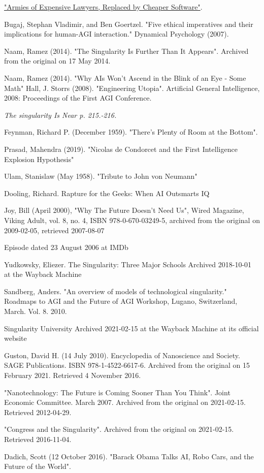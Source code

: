\documentclass[a4paper]{article}
\begin{document}
\begin{thebibliography}{9}
\href{https://www.nytimes.com/2011/03/05/science/05legal.html}{"Armies of Expensive Lawyers, Replaced by Cheaper Software"}.

  Bugaj, Stephan Vladimir, and Ben Goertzel. "Five ethical imperatives and their implications for human-AGI interaction." Dynamical Psychology (2007).

Naam, Ramez (2014). "The Singularity Is Further Than It Appears". Archived from the original on 17 May 2014. 

 Naam, Ramez (2014). "Why AIs Won't Ascend in the Blink of an Eye - Some Math"
 Hall, J. Storrs (2008). "Engineering Utopia". Artificial General Intelligence, 2008: Proceedings of the First AGI Conference.

 \textit{The singularity Is Near p. 215.-216.}

 Feynman, Richard P. (December 1959). "There's Plenty of Room at the Bottom".

Prasad, Mahendra (2019). "Nicolas de Condorcet and the First Intelligence Explosion Hypothesis"

 Ulam, Stanislaw (May 1958). "Tribute to John von Neumann"

 Dooling, Richard. Rapture for the Geeks: When AI Outsmarts IQ

Joy, Bill (April 2000), "Why The Future Doesn't Need Us", Wired Magazine, Viking Adult, vol. 8, no. 4, ISBN 978-0-670-03249-5, archived from the original on 2009-02-05, retrieved 2007-08-07

 Episode dated 23 August 2006 at IMDb

Yudkowsky, Eliezer. The Singularity: Three Major Schools Archived 2018-10-01 at the Wayback Machine

Sandberg, Anders. "An overview of models of technological singularity." Roadmaps to AGI and the Future of AGI Workshop, Lugano, Switzerland, March. Vol. 8. 2010.

 Singularity University Archived 2021-02-15 at the Wayback Machine at its official website

 Guston, David H. (14 July 2010). Encyclopedia of Nanoscience and Society. SAGE Publications. ISBN 978-1-4522-6617-6. Archived from the original on 15 February 2021. Retrieved 4 November 2016.

"Nanotechnology: The Future is Coming Sooner Than You Think". Joint Economic Committee. March 2007. Archived from the original on 2021-02-15. Retrieved 2012-04-29.

 "Congress and the Singularity". Archived from the original on 2021-02-15. Retrieved 2016-11-04.

Dadich, Scott (12 October 2016). "Barack Obama Talks AI, Robo Cars, and the Future of the World".

\end{thebibliography}
\end{document}
